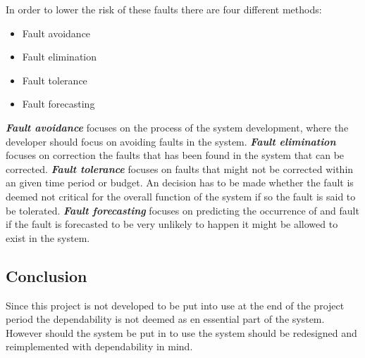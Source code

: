 In order to lower the risk of these faults there are four different methods:
\begin{itemize}
\item Fault avoidance
\item Fault elimination
\item Fault tolerance
\item Fault forecasting
\end{itemize}
\textit{\textbf{Fault avoidance}} focuses on the process of the system development, where the developer should focus on avoiding faults in the system.
\textit{\textbf{Fault elimination}} focuses on correction the faults that has been found in the system that can be corrected. 
\textit{\textbf{Fault tolerance}} focuses on faults that might not be corrected within an given time period or budget.
An decision has to be made whether the fault is deemed not critical for the overall function of the system if so the fault is said to be tolerated.
\textit{\textbf{Fault forecasting}} focuses on predicting the occurrence of and fault if the fault is forecasted to be very unlikely to happen it might be allowed to exist in the system. 

\subsection{Conclusion}
Since this project is not developed to be put into use at the end of the project period the dependability is not deemed as en essential part of the system. 
However should the system be put in to use the system should be redesigned and reimplemented with dependability in mind. 
